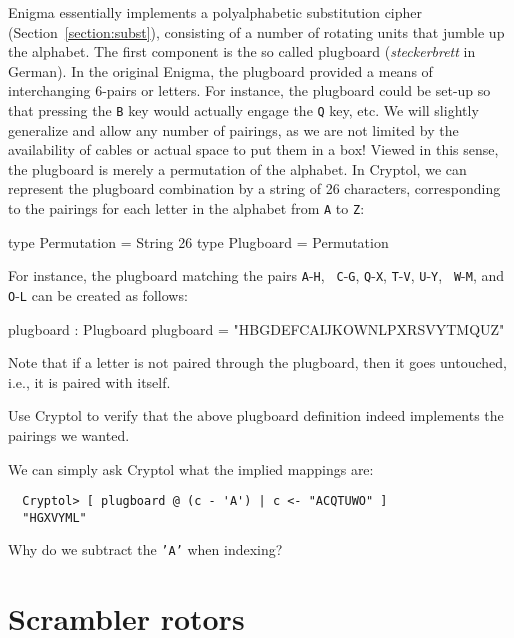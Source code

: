 Enigma essentially implements a polyalphabetic substitution cipher
(Section~\ref{section:subst})\indPolyAlphSubst, consisting of a number
of rotating units that jumble up the alphabet.  The first component is
the so called plugboard ({\em steckerbrett} in
German)\indEnigmaPlugboard. In the original Enigma, the plugboard
provided a means of interchanging 6-pairs or letters. For instance,
the plugboard could be set-up so that pressing the {\tt B} key would
actually engage the {\tt Q} key, etc.  We will slightly generalize and
allow any number of pairings, as we are not limited by the
availability of cables or actual space to put them in a box! Viewed in
this sense, the plugboard is merely a permutation of the alphabet. In
Cryptol, we can represent the plugboard combination by a string of 26
characters, corresponding to the pairings for each letter in the
alphabet from {\tt A} to {\tt Z}:

\begin{code}
  type Permutation = String 26
  type Plugboard = Permutation
\end{code}
For instance, the plugboard matching the pairs {\tt A}-{\tt H}, {\tt
  C}-{\tt G}, {\tt Q}-{\tt X}, {\tt T}-{\tt V}, {\tt U}-{\tt Y}, {\tt
  W}-{\tt M}, and {\tt O}-{\tt L} can be created as follows:
\begin{code}
  plugboard : Plugboard
  plugboard = "HBGDEFCAIJKOWNLPXRSVYTMQUZ"
\end{code}
Note that if a letter is not paired through the plugboard, then it
goes untouched, i.e., it is paired with itself.

\begin{Exercise}\label{ex:enigma:1}
  Use Cryptol to verify that the above plugboard definition indeed
  implements the pairings we wanted.
\end{Exercise}
\begin{Answer}
We can simply ask Cryptol what the implied mappings are:
\begin{Verbatim}
  Cryptol> [ plugboard @ (c - 'A') | c <- "ACQTUWO" ]
  "HGXVYML"
\end{Verbatim}
Why do we subtract the {\tt 'A'} when indexing?
\end{Answer}


\section{Scrambler rotors}
\label{sec:enigma:scramblerrotors}

